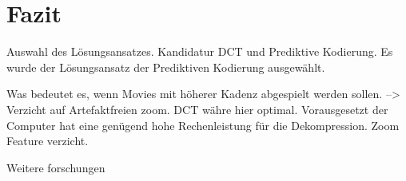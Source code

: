 \section{Fazit}
Auswahl des Lösungsansatzes. Kandidatur DCT und Prediktive Kodierung. 
Es wurde der Lösungsansatz der Prediktiven Kodierung ausgewählt.

Was bedeutet es, wenn Movies mit höherer Kadenz abgespielt werden sollen. --> Verzicht auf Artefaktfreien zoom. DCT währe hier optimal. Vorausgesetzt der Computer hat eine genügend hohe Rechenleistung für die Dekompression.
Zoom Feature verzicht.

Weitere forschungen
